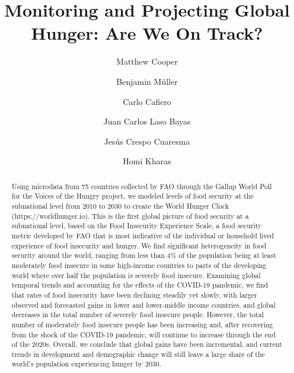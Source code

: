 \documentclass{article}
\begin{document}
\title{Monitoring and Projecting Global Hunger: Are We On Track?}

\author[1,2,*]{Matthew Cooper}
\author[2,3]{Benjamin Müller}
\author[4]{Carlo Cafiero}
\author[2,5]{Juan Carlos Laso Bayas}
\author[3,5,6,7]{Jesús Crespo Cuaresma}
\author[2,8]{Homi Kharas}


\maketitle
\begin{abstract}
Using microdata from 75 countries collected by FAO through the Gallup World Poll for the Voices of the Hungry project, we modeled levels of food security at the subnational level from 2010 to 2030 to create the World Hunger Clock (https://worldhunger.io).  This is the first global picture of food security at a subnational level, based on the Food Insecurity Experience Scale, a food security metric developed by FAO that is most indicative of the individual or household lived experience of food insecurity and hunger.  We find significant heterogeneity in food security around the world, ranging from less than 4\% of the population being at least moderately food insecure in some high-income countries to parts of the developing world where over half the population is severely food insecure.  Examining global temporal trends and accounting for the effects of the COVID-19 pandemic, we find that rates of food insecurity have been declining steadily yet slowly, with larger observed and forecasted gains in lower and lower-middle income countries, and global decreases in the total number of severely food insecure people.  However, the total number of moderately food insecure people has been increasing and, after recovering from the shock of the COVID-19 pandemic, will continue to increase through the end of the 2020s.  Overall, we conclude that global gains have been incremental, and current trends in development and demographic change will still leave a large share of the world's population experiencing hunger by 2030.  \end{abstract}
\end{document}
